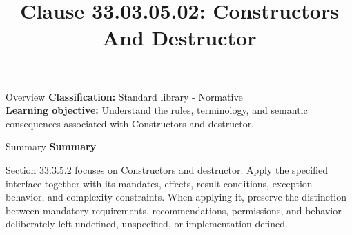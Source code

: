 \documentclass[10pt,letterpaper]{article}
\title{Clause 33.03.05.02: Constructors And Destructor}
\author{}
\date{}
\begin{document}
\maketitle
\begin{CornellOverviewBox}{Overview}
\textbf{Classification:} Standard library - Normative\\[2pt]
\textbf{Learning objective:} Understand the rules, terminology, and semantic consequences associated with Constructors and destructor.
\end{CornellOverviewBox}\begin{CornellSummaryBox}{Summary}
{\sffamily\bfseries\color{Accent} Summary}\par\vspace{3pt}Section 33.3.5.2 focuses on Constructors and destructor. Apply the specified interface together with its mandates, effects, result conditions, exception behavior, and complexity constraints. When applying it, preserve the distinction between mandatory requirements, recommendations, permissions, and behavior deliberately left undefined, unspecified, or implementation-defined.
\end{CornellSummaryBox}
\end{document}
